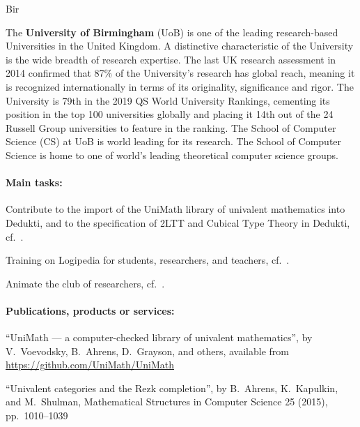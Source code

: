 \begin{sitedescription}{Bir}

The \textbf{University of Birmingham} (UoB) is one of the leading research-based Universities in the United Kingdom. A distinctive
characteristic of the University is the wide breadth of research expertise. The last UK research assessment in 2014 confirmed that
87\% of the University’s research has global reach, meaning it is recognized internationally in terms of its originality, significance and rigor. The University is 79th in the 2019 QS World University Rankings, cementing its position in the top 100 universities globally and placing it 14th out of the 24 Russell Group universities to feature in the ranking. The School of Computer Science (CS) at UoB is world leading for its research. 
The School of Computer Science is home to one of world's leading theoretical computer science groups.

\paragraph{Main tasks:}

\begin{compactitem}
\item Contribute to the import of the UniMath library of univalent mathematics into Dedukti, and to the specification of 2LTT and Cubical Type Theory in Dedukti, cf.\ .
\item Training on Logipedia for students, researchers, and teachers, cf.\ .
\item Animate the club of researchers, cf.\ .

\item{} 
\end{compactitem}

\paragraph{Publications, products or services:}

\begin{compactitem}
 \item ``UniMath --- a computer-checked library of univalent mathematics'', by V.~Voevodsky, B.~Ahrens, D.~Grayson, and others, available from \url{https://github.com/UniMath/UniMath}
 \item ``Univalent categories and the Rezk completion'', by B.~Ahrens, K.~Kapulkin, and M.~Shulman, Mathematical Structures in Computer Science 25 (2015), pp.~1010--1039
\end{compactitem}


\end{sitedescription}
